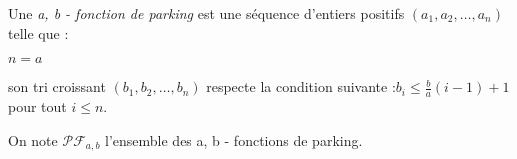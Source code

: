\begin{definition}
    Une \emph{a, b - fonction de parking} est une séquence d'entiers
    positifs $(a_1, a_2, \ldots, a_n)$ telle que :\\
    \begin{itemize*}
        \item $n = a$\\
        \item son tri croissant $(b_1, b_2, \ldots, b_n)$ respecte la
        condition suivante :$b_i \leqslant \frac{b}{a}(i-1) + 1$ 
        pour tout $i \leqslant n$.
    \end{itemize*}
\end{definition}

On note $\mathcal{PF}_{a,b}$ l'ensemble des a, b - fonctions de parking. 
